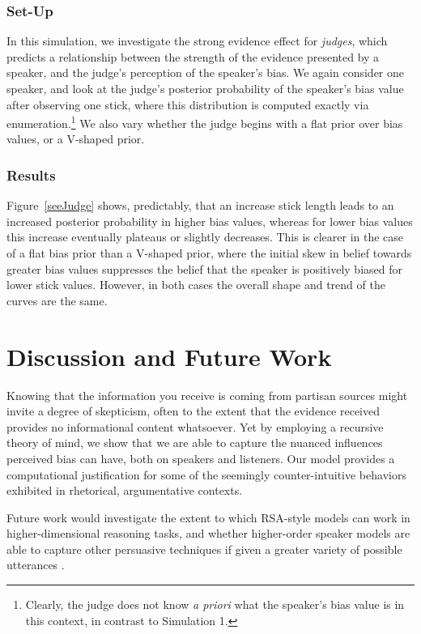 \documentclass[10pt,letterpaper]{article}
\begin{document}
\subsubsection{Set-Up}
In this simulation, we investigate the strong evidence effect for \textit{judges}, which predicts a relationship between 
the strength of the evidence presented by a speaker, and the judge's perception of the speaker's bias.
We again consider one speaker, and look at the judge's posterior probability of the speaker's bias value after 
observing one stick, where this distribution is computed exactly via enumeration.\footnote{Clearly, the judge does 
not know \textit{a priori} what the speaker's bias value is in this context, in contrast to Simulation 1.} We also vary 
whether the judge begins with a flat prior over bias values, or a V-shaped prior.

\subsubsection{Results}

Figure~\ref{seeJudge} shows, predictably, that an increase stick length leads to an increased posterior probability in
higher bias values, whereas for lower bias values this increase eventually plateaus or slightly decreases. This is clearer 
in the case of a flat bias prior than a V-shaped prior, where the initial skew in belief towards greater bias values suppresses
the belief that the speaker is positively biased for lower stick values. However, in both cases the overall shape and trend 
of the curves are the same.



\section{Discussion and Future Work}
Knowing that the information you receive is coming from partisan sources might invite a degree of skepticism, often to
the extent that the evidence received provides no informational content whatsoever. Yet by employing a recursive theory of
mind, we show that we are able to capture the nuanced influences perceived bias can have,
both on speakers and listeners. Our model provides a computational justification for some of the seemingly counter-intuitive
behaviors exhibited in rhetorical, argumentative contexts.

Future work would investigate the extent to which RSA-style models can work in higher-dimensional reasoning tasks,
and whether higher-order speaker models are able to capture other persuasive techniques if given a greater variety of
possible utterances \cite{cialdini1993influence, falk_persuasion_2018}.
\end{document}
